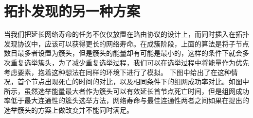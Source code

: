 \documentclass[a4paper,AutoFakeBold,oneside,12pt]{book}
\begin{document}
  \section{拓扑发现的另一种方案}
  当我们把延长网络寿命的任务不仅仅放置在路由协议的设计上，而同时插入在拓扑发现协议中，应该可以获得更长的网络寿命。在成簇阶段，上面的算法是将子节点数目最多者设置为簇头，但是簇头的能量却有可能是最小的，这样的条件下就会多次重复选举簇头，为了减少重复选举过程，我们可以在选举过程中将能量作为优先考虑要素，抱着这种想法在同样的环境下进行了模拟。
  下图中给出了在这种情况，首个节点出现死亡的时间的对比，以及相同条件下的组网成功率对比。如图中所示，虽然选举能量最大者作为簇头可以有效延长首节点死亡时间，但是组网成功率低于最大连通性的簇头选举方法，网络寿命与最佳连通性两者之间如果在提出的选举簇头的方案上做改变并不能同时满足。
  \begin{figure}[htbp]
\centering  
\end{figure}
\end{document}
